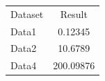 \documentclass{article}
\begin{document}
\begin{tabular}{lS}
  Dataset & {Result}\\
  Data1 & 0.12345\\
  Data2 & 10.6789\\
  Data4 & 200.09876
\end{tabular}
\end{document}
